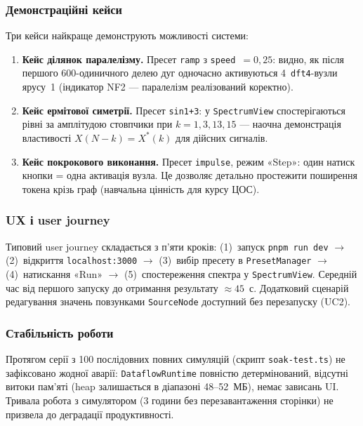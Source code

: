 \subsubsection*{Демонстраційні кейси}

Три кейси найкраще демонструють можливості системи:

\begin{enumerate}
  \item \textbf{Кейс ділянок паралелізму.} Пресет \texttt{ramp} з
    \texttt{speed}~$=0{,}25$: видно, як після першого 600-одиничного
    делею дуг одночасно активуються 4~\texttt{dft4}-вузли ярусу~1
    (індикатор NF2 --- паралелізм реалізований коректно).
  \item \textbf{Кейс ермітової симетрії.} Пресет \texttt{sin1+3}: у
    \texttt{SpectrumView} спостерігаються рівні за амплітудою
    стовпчики при $k=1,3,13,15$ --- наочна демонстрація властивості
    $X(N-k) = X^*(k)$ для дійсних сигналів.
  \item \textbf{Кейс покрокового виконання.} Пресет \texttt{impulse},
    режим «Step»: один натиск кнопки = одна активація вузла. Це
    дозволяє детально простежити поширення токена крізь граф
    (навчальна цінність для курсу ЦОС).
\end{enumerate}

\subsubsection*{UX і user journey}

Типовий user journey складається з п'яти кроків:
(1)~запуск \texttt{pnpm run dev} $\to$
(2)~відкриття \texttt{localhost:3000} $\to$
(3)~вибір пресету в \texttt{PresetManager} $\to$
(4)~натискання «Run» $\to$
(5)~спостереження спектра у \texttt{SpectrumView}.
Середній час від першого запуску до отримання результату $\approx 45$~с.
Додатковий сценарій редагування значень повзунками \texttt{SourceNode}
доступний без перезапуску (UC2).

\subsubsection*{Стабільність роботи}

Протягом серії з 100 послідовних повних симуляцій (скрипт
\texttt{soak-test.ts}) не зафіксовано жодної аварії: \texttt{DataflowRuntime}
повністю детермінований, відсутні витоки пам'яті (heap залишається
в діапазоні 48--52~МБ), немає зависань UI. Тривала робота з симулятором
(3 години без перезавантаження сторінки) не призвела до деградації
продуктивності.


